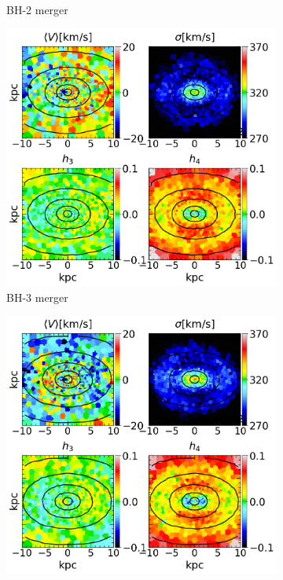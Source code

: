 \documentclass[english, twoside]{HYgradu}
\begin{document}
\begin{figure}
\begin{subfigure}[b]{0.49\textwidth}
		\caption{BH-2 merger}
	\end{subfigure}
	\begin{subfigure}[b]{0.49\textwidth}
		\includegraphics[width=\textwidth]{BH_3.png}
		\caption{BH-3 merger}
	\end{subfigure}
	\begin{subfigure}[b]{0.49\textwidth}
		\includegraphics[width=\textwidth]{BH_4.png}

\end{subfigure}
\end{figure}
\end{document}
